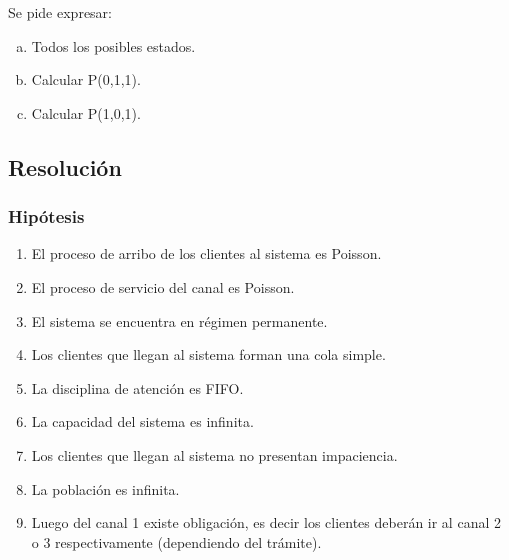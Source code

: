 \documentclass[a4paper,11pt]{article}
\begin{document}
Se pide expresar:

\begin{enumerate}[a)]
  \item Todos los posibles estados.
  \item Calcular P(0,1,1).
  \item Calcular P(1,0,1).
\end{enumerate}

\vspace{13pt}
\leftskip=0pt
\parindent=0pt
\subsection{\textbf{Resolución}}

\vspace{21pt}
\subsubsection*{Hipótesis}

\leftskip=36pt
\parindent=-18pt
\begin{enumerate}[1.]
  \item El proceso de arribo de los clientes al sistema es Poisson.
  \item El proceso de servicio del canal es Poisson.
  \item El sistema se encuentra en régimen permanente.
  \item Los clientes que llegan al sistema forman una cola simple.
  \item La disciplina de atención es FIFO.
  \item La capacidad del sistema es infinita.
  \item Los clientes que llegan al sistema no presentan impaciencia.
  \item La población es infinita. 
  \item Luego del canal 1 existe obligación, es decir los clientes deberán ir al
     canal 2 o 3 respectivamente (dependiendo del trámite).
\end{enumerate}
\end{document}
